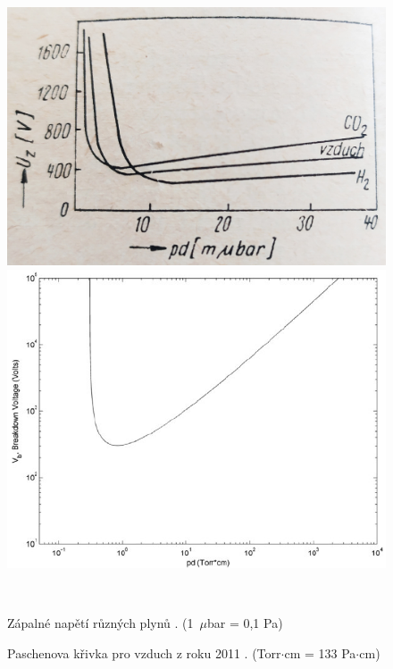 \begin{figure}[h!]
\centering
\begin{minipage}[c]{200pt}
\includegraphics[width=\textwidth]{Figure/02/paschen.png}
\end{minipage}
\begin{minipage}[c]{200pt}
\includegraphics[width=\textwidth]{Figure/02/paschen_air.png}
\end{minipage}
\\
\begin{minipage}[c]{200pt}
\caption[Zápalné napětí různých plynů.]{Zápalné napětí různých plynů \cite{kracik}. (1~$\mu$bar = 0,1 Pa)}
\label{obr:paschen}
\end{minipage}
\begin{minipage}[c]{5pt}
\end{minipage}
\begin{minipage}[c]{200pt}
\caption[Paschenova křivka pro vzduch]{Paschenova křivka pro vzduch z roku 2011 \cite{Martins2011}. (Torr$\cdot$cm = 133 Pa$\cdot$cm)}
\label{obr:paschen_air}
\end{minipage}
\end{figure}

